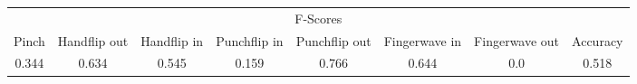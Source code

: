 \documentclass{standalone}
\begin{document}
 
 \begin{tabular}{|c|c|c|c|c|c|c ||c|}
\cline{1-8}\multicolumn{8}{|c|}{F-Scores} \\ 
\cline{1-8}Pinch & Handflip out & Handflip in & Punchflip in & Punchflip out & Fingerwave in & Fingerwave out & Accuracy\\ 
\cline{1-8}0.344 & 0.634 & 0.545 & 0.159 & 0.766 & 0.644 & 0.0 & 0.518\\ 
 \cline{1-8}\hline \end{tabular}
 
\end{document}
